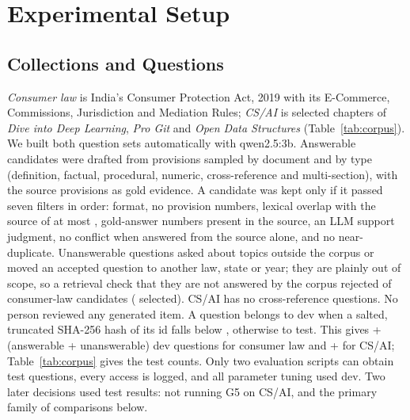 \section{Experimental Setup}
\label{sec:setup}



\subsection{Collections and Questions}
\emph{Consumer law} is India's Consumer Protection Act, 2019 with its E-Commerce, Commissions, Jurisdiction and Mediation Rules; \emph{CS/AI} is selected chapters of \emph{Dive into Deep Learning}, \emph{Pro Git} and \emph{Open Data Structures} (Table~\ref{tab:corpus}).
We built both question sets automatically with qwen2.5:3b.
Answerable candidates were drafted from provisions sampled by document and by type (definition, factual, procedural, numeric, cross-reference and multi-section), with the source provisions as gold evidence.
A candidate was kept only if it passed seven filters in order: format, no provision numbers, lexical overlap with the source of at most , gold-answer numbers present in the source, an LLM support judgment, no conflict when answered from the source alone, and no near-duplicate.
Unanswerable questions asked about topics outside the corpus or moved an accepted question to another law, state or year; they are plainly out of scope, so a retrieval check that they are not answered by the corpus rejected  of  consumer-law candidates ( selected).
CS/AI has no cross-reference questions. No person reviewed any generated item.
A question belongs to dev when a salted, truncated SHA-256 hash of its id falls below , otherwise to test.
This gives + (answerable + unanswerable) dev questions for consumer law and + for CS/AI; Table~\ref{tab:corpus} gives the test counts.
Only two evaluation scripts can obtain test questions, every access is logged, and all parameter tuning used dev. Two later decisions used test results: not running G5 on CS/AI, and the primary family of comparisons below.

